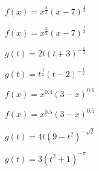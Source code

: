 \documentclass{ximera}
\begin{document}
\begin{question} $f(x) = x^{\frac{2}{3}}(x - 7)^{\frac{1}{3}}$
\end{question}
\begin{question} $f(x) = x^{\frac{3}{2}}(x - 7)^{\frac{1}{3}}$  
\end{question}
\begin{question} $g(t) = 2t(t+3)^{-\frac{1}{3}}$  
\end{question}
\begin{question} $g(t) = t^{\frac{3}{2}}(t-2)^{-\frac{1}{2}}$  
\end{question}
\begin{question} $f(x) = x^{0.4} (3-x)^{0.6}$  
\end{question}
\begin{question} $f(x) = x^{0.5} (3-x)^{0.5}$  
\end{question}
\begin{question} $g(t) = 4t (9-t^2)^{-\sqrt{2}}$  
\end{question}
\begin{question} $g(t) = 3(t^2+1)^{-\pi}$
\end{question}



\end{document}
